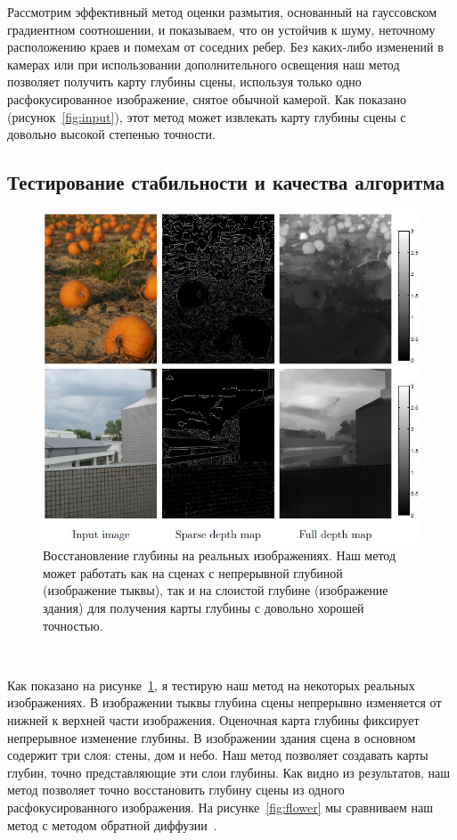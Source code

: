 Рассмотрим эффективный метод оценки размытия, основанный на гауссовском градиентном соотношении, и показываем, что он устойчив к шуму, неточному расположению краев и помехам от соседних ребер. Без каких-либо изменений в камерах или при использовании дополнительного освещения наш метод позволяет получить карту глубины сцены, используя только одно расфокусированное изображение, снятое обычной камерой. Как показано (рисунок~\ref{fig:input}), этот метод может извлекать карту глубины сцены с довольно высокой степенью точности.


\subsection{Тестирование стабильности и качества алгоритма}

\begin{figure}[H]
	\centering
	\includegraphics[width=0.7\linewidth]{pics/comparison}
	\caption{Восстановление глубины на реальных изображениях. Наш метод может работать как на сценах с непрерывной глубиной (изображение тыквы), так и на слоистой глубине (изображение здания) для получения карты глубины с довольно хорошей точностью.}
	\label{fig:comparison}
\end{figure}\

Как показано на рисунке~\ref{fig:comparison}, я тестирую наш метод на некоторых реальных изображениях. В изображении тыквы глубина сцены непрерывно изменяется от нижней к верхней части изображения. Оценочная карта глубины фиксирует непрерывное изменение глубины. В изображении здания сцена в основном содержит три слоя: стены, дом и небо. Наш метод позволяет создавать карты глубин, точно представляющие эти слои глубины. Как видно из результатов, наш метод позволяет точно восстановить глубину сцены из одного расфокусированного изображения. На рисунке~\ref{fig:flower} мы сравниваем наш метод с методом обратной диффузии~\cite{Proc}.

